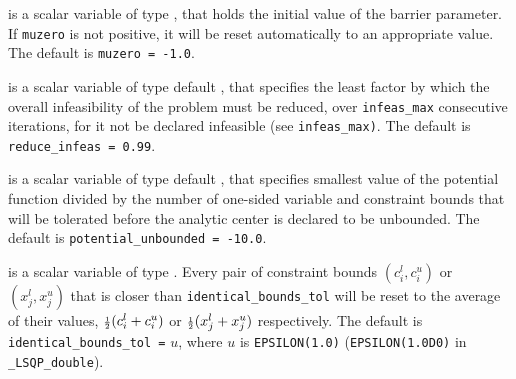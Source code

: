 \documentclass{galahad}
\newcommand{\packagename}{LSQP}
\newcommand{\fullpackagename}{\libraryname\_\-\packagename}
\begin{document}
\begin{description}
  is a scalar variable of type \realdp, that holds the
initial value of the barrier parameter. If {\tt muzero} is
not positive, it will be reset automatically to an appropriate value.
The default is {\tt muzero = -1.0}.

  is a scalar variable of type default 
\realdp, that specifies the
least factor by which the overall infeasibility of the problem must be reduced,
over {\tt infeas\_max} consecutive iterations, 
for it not be declared infeasible (see {\tt infeas\_max)}.
The default is {\tt reduce\_infeas = 0.99}.

  is a scalar variable of type default 
\realdp, that specifies smallest
value of the potential function divided by the number of one-sided variable and
constraint bounds that will be tolerated before the analytic center is 
declared to be unbounded.
The default is {\tt potential\_u\-nbounded = -10.0}.




is a scalar variable of type \realdp.
Every pair of constraint bounds 
$(c_{i}^{l}, c_{i}^{u})$ or $(x_{j}^{l}, x_{j}^{u})$
that is closer than {\tt identical\_bounds\_tol} 
will be reset to the average of their values,
${\scriptstyle \frac{1}{2}} (c_{i}^{l} + c_{i}^{u})$ or ${\scriptstyle \frac{1}{2}} (x_{j}^{l} + x_{j}^{u})$
respectively.
The default is {\tt identical\_bounds\_tol =} $u$,
where $u$ is {\tt EPSILON(1.0)} ({\tt EPSILON(1.0D0)} in 
{\tt \fullpackagename\_double}).


\end{description}
\end{document}
